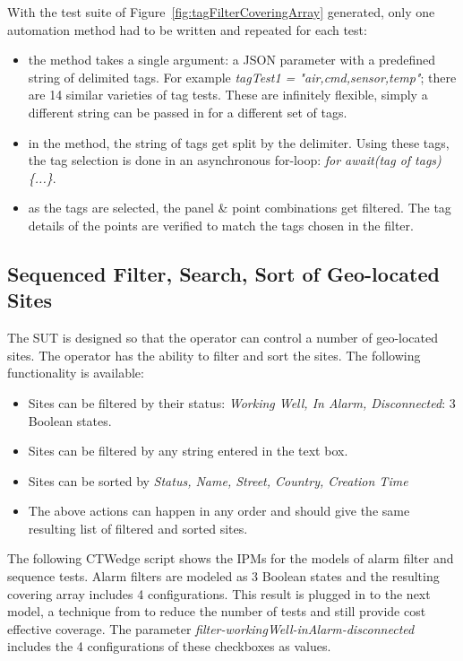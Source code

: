 \documentclass[conference]{IEEEtran}
\begin{document}
	With the test suite of Figure~\ref{fig:tagFilterCoveringArray} generated, only one automation method had to be written and repeated for each test:
	
	\begin{itemize}
		\item the method takes a single argument: a JSON parameter with a predefined string of delimited tags. For example \textit{tagTest1 = "air,cmd,sensor,temp"}; there are 14 similar varieties of tag tests. These are infinitely flexible, simply a different string can be passed in for a different set of tags.
		\item in the method, the string of tags get split by the delimiter. Using these tags, the tag selection is done in an asynchronous for-loop: \emph{for await(tag of tags) \{...\}}. 
		\item as the tags are selected, the panel \& point combinations get filtered. The tag details of the points are verified to match the tags chosen in the filter.
	\end{itemize}
	
	\subsection{Sequenced Filter, Search, Sort of Geo-located Sites}

	The SUT is designed so that the operator can control a number of geo-located sites. 
	The operator has the ability to filter and sort the sites.
	The following functionality is available:
	\begin{itemize}
		\item Sites can be filtered by their status: \textit{Working Well, In Alarm, Disconnected}: 3 Boolean states.
		\item Sites can be filtered by any string entered in the text box.
		\item Sites can be sorted by \textit{Status, Name, Street, Country, Creation Time}
		\item The above actions can happen in any order and should give the same resulting list of filtered and sorted sites.
	\end{itemize}

	The following CTWedge script shows the IPMs for the models of alarm filter and sequence tests. 
	Alarm filters are modeled as 3 Boolean states and the resulting covering array includes 4 configurations. 
	This result is plugged in to the next model, a technique from \cite{ozcan2017applications} to reduce the number of tests and still provide cost effective coverage.
	The parameter \textit{filter-workingWell-inAlarm-disconnected} includes the 4 configurations of these checkboxes as values. 
\end{document}
